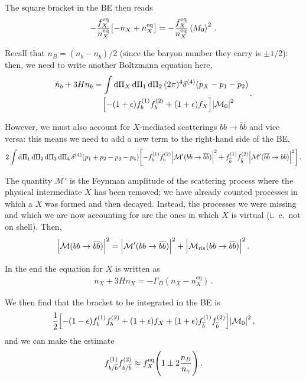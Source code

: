 \documentclass[main.tex]{subfiles}
\begin{document}
The square bracket in the BE then reads 
%
\begin{align}
-\frac{f_X^{\text{eq}}}{n_X^{\text{eq}}} \qty[- n_X + n_X^{\text{eq}}]
= -\frac{f_X^{\text{eq}}}{n_X^{\text{eq}}}
\expval{M_0}^2
\,.
\end{align}

Recall that \(n_B = (n_b - n_{\overline{b}}) / 2\) (since the baryon number they carry is \(\pm 1/2\)): then, we need to write another Boltzmann equation here, 
%
\begin{align}
\begin{split}
\dot{n}_b + 3 H n_b &=
\int \dd{\Pi_X } \dd{\Pi_1 } \dd{\Pi _2} (2 \pi )^{4} \delta^{(4)}(p_X - p_1 - p_2)\\
&\phantom{=}\ 
\qty[- (1 + \epsilon ) f_b^{(1)} f_b^{(2)} +
(1 + \epsilon ) f_X
] \abs{\mathcal{M}_0}^2
\end{split}
\,.
\end{align}

However, we must also account for \(X\)-mediated scatterings \(bb \to \overline{b} \overline{b}\) and vice versa: this means we need to add a new term to the right-hand side of the BE, 
%
\begin{align}
2 \int \dd{\Pi_1 } \dd{\Pi_2 } \dd{\Pi_3 } \dd{\Pi_4 } \delta^{(4)}(p_1 + p_2 - p_3 - p_4)
\qty[-f_b^{(1)} f_b^{(2)} \abs{\mathcal{M}' (bb \to \overline{b} \overline{b})}^2 
+
f_{\overline{b}}^{(1)} f_{\overline{b}}^{(2)} \abs{\mathcal{M}' (\overline{b} \overline{b} \to bb) }^2
]
\,.
\end{align}

The quantity \(\mathcal{M}'\) is the Feynman amplitude of the scattering process where the physical intermediate \(X\) has been removed; we have already counted processes in which a \(X\) was formed and then decayed.
Instead, the processes we were missing and which we are now accounting for are the ones in which \(X\) is virtual (i.\ e.\ not on shell).
Then, 
%
\begin{align}
\abs{\mathcal{M} (bb \to \overline{b} \overline{b})}^2= 
\abs{\mathcal{M}' (bb \to \overline{b} \overline{b})}^2
+ \abs{\mathcal{M} _{\text{ris}} ( bb  \to \overline{b} \overline{b})}^2
\,.
\end{align}

In the end the equation for \(X\) is written as 
%
\begin{align}
\dot{n}_X + 3 H n_X = - \Gamma _D (n_X - n_X^{\text{eq}}) 
\,.
\end{align}

We then find that the bracket to be integrated in the BE is
%
\begin{align} \label{eq:BE-term}
\frac{1}{2} \qty[- (1-\epsilon ) f_b^{(1)} f_b^{(2)} + (1 + \epsilon ) f_X 
+ (1 + \epsilon ) f_{\overline{b}}^{(1)} f_{\overline{b}}^{(2)} ]\abs{\mathcal{M}_0}^2
\,,
\end{align}
%
and we can make the estimate 
%
\begin{align}
f_{b/\overline{b}}^{(1)}
f_{b/\overline{b}}^{(2)} \approx 
f_X^{\text{eq}} \qty(1 \pm 2 \frac{n_B}{n_\gamma })
\,.
\end{align}
\end{document}

